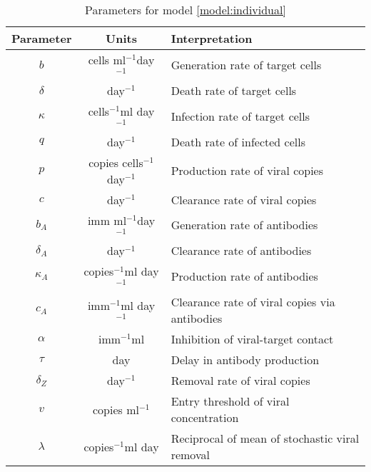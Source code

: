 \documentclass[11pt]{article}
\numberwithin{equation}{subsection}
\newcommand{\iv}{$^{-1}$}
\begin{document}
    \begin{table}[h!]
        \centering
        \caption{Parameters for model \ref{model:individual}}
        \vspace{1em}
        \begin{tabular}{ccl} \hline\hline
            Parameter   & Units     & Interpretation \\\hline\hline
            $b$         & cells ml\iv day\iv
                                    & Generation rate of target cells \\
            $\delta$    & day\iv
                                    & Death rate of target cells \\
            $\kappa$    & cells\iv ml day\iv
                                    & Infection rate of target cells \\
            $q$         & day\iv
                                    & Death rate of infected cells \\
            $p$         & copies cells\iv day\iv
                                    & Production rate of viral copies \\
            $c$         & day\iv
                                    & Clearance rate of viral copies \\
            $b_A$       & imm ml\iv day\iv
                                    & Generation rate of antibodies \\
            $\delta_A$  & day\iv
                                    & Clearance rate of antibodies \\
            $\kappa_A$  & copies\iv ml day\iv
                                    & Production rate of antibodies \\
            $c_A$       & imm\iv ml day\iv
                                    & Clearance rate of viral copies via antibodies \\
            $\alpha$    & imm\iv ml
                                    & Inhibition of viral-target contact \\
            $\tau$      & day
                                    & Delay in antibody production \\
            $\delta_Z$  & day\iv
                                    & Removal rate of viral copies \\
            $v$         & copies ml\iv
                                    & Entry threshold of viral concentration \\
            $\lambda$   & copies\iv ml day
                                    & Reciprocal of mean of stochastic viral removal \\

\end{tabular}
\end{table}
\end{document}
